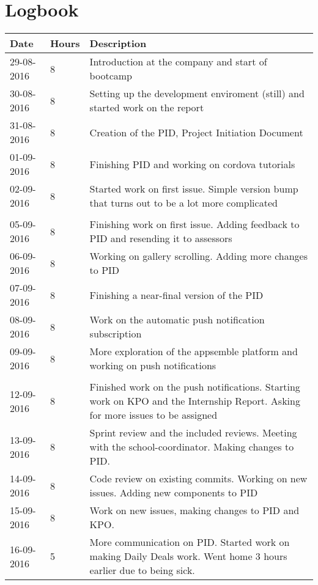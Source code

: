 \chapter{Logbook}
\begin{tabular}{|p{2cm}|p{1cm}|p{10cm}|}
	\hline
	\textbf{Date} & \textbf{Hours} &  \textbf{Description} \\
	\hline
	29-08-2016 & 8  & Introduction at the company and start of bootcamp \\ \hline
	30-08-2016 & 8  & Setting up the development enviroment (still) and started work on the report \\ \hline
	31-08-2016 & 8 & Creation of the PID, Project Initiation Document \\ \hline
	01-09-2016 & 8 & Finishing PID and working on cordova tutorials \\ \hline
	02-09-2016 & 8 & Started work on first issue. Simple version bump that turns out to be a lot more complicated \\ \hline

	\\ \hline
	
	05-09-2016 & 8 & Finishing work on first issue. Adding feedback to PID and resending it to assessors \\ \hline
	06-09-2016 & 8 & Working on gallery scrolling. Adding more changes to PID \\ \hline
	07-09-2016 & 8 & Finishing a near-final version of the PID \\ \hline
	08-09-2016 & 8 & Work on the automatic push notification subscription \\ \hline
	09-09-2016 & 8 & More exploration of the appsemble platform and working on push notifications \\ \hline
	
	\\ \hline
	
	12-09-2016 & 8 & Finished work on the push notifications. Starting work on KPO and the Internship Report. Asking for more issues to be assigned \\ \hline
	13-09-2016 & 8 & Sprint review and the included reviews. Meeting with the school-coordinator. Making changes to PID. \\ \hline
	14-09-2016 & 8 & Code review on existing commits. Working on new issues. Adding new components to PID \\ \hline
	15-09-2016 & 8 & Work on new issues, making changes to PID and KPO. \\ \hline
	16-09-2016 & 5 & More communication on PID. Started work on making Daily Deals work. Went home 3 hours earlier due to being sick. \\ \hline
	

\end{tabular}
